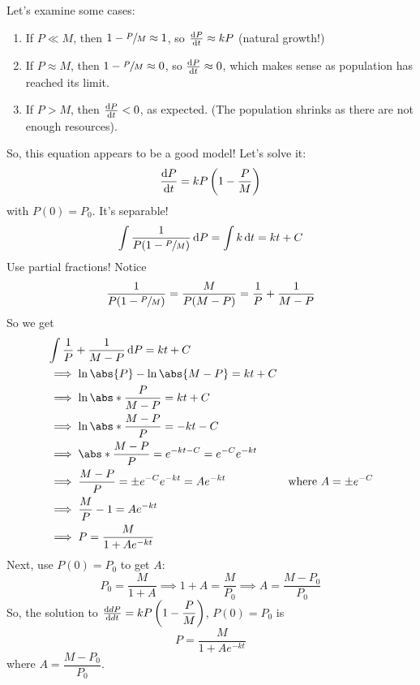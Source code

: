 Let's examine some cases:
\begin{enumerate}[label=(\Roman*)]
    \item If $ P\ll M $, then $ 1-\sfrac{P}{M}\approx 1 $, so $ \odv{P}{t} \approx kP $
          (natural growth!)
    \item If $ P\approx M $, then $ 1-\sfrac{P}{M}\approx 0 $, so $ \odv{P}{t}\approx 0 $,
          which makes sense as population has reached its limit.
    \item If $ P>M $, then $ \odv{P}{t} <0 $, as expected. (The population
          shrinks as there are not enough resources).
\end{enumerate}
So, this equation appears to be a good model! Let's solve it:
\[ \odv{P}{t} =kP\left(1-\frac{P}{M}\right) \]
with $ P(0)=P_0 $. It's separable!
\[ \int \frac{1}{P(1-\sfrac{P}{M})}\odif{P}=\int k\odif{t} =kt+C \]
Use partial fractions! Notice
\[ \frac{1}{P(1-\sfrac{P}{M})}=\frac{M}{P(M-P)} =\frac{1}{P} +\frac{1}{M-P} \]
So we get
\begin{align*}
     & \int \frac{1}{P} +\frac{1}{M-P}\odif{P}  =kt+C                                                   \\
     & \implies  \ln\abs{P}-\ln\abs{M-P}            =kt+C                                               \\
     & \implies  \ln\abs*{\frac{P}{M-P}}        =kt+C                                                   \\
     & \implies \ln\abs*{\frac{M-P}{P}}         =-kt-C                                                  \\
     & \implies  \abs*{\frac{M-P}{P}}           =e^{-kt-C}=e^{-C}e^{-kt}                                \\
     & \implies  \frac{M-P}{P}                  =\pm e^{-C}e^{-kt}=Ae^{-kt} & \text{where }A=\pm e^{-C} \\
     & \implies  \frac{M}{P} -1                 =Ae^{-kt}                                               \\
     & \implies  P                              =\frac{M}{1+Ae^{-kt}}
\end{align*}
Next, use $ P(0)=P_0 $ to get $ A $:
\[ P_0=\frac{M}{1+A}\implies 1+A=\frac{M}{P_0}\implies A=\frac{M-P_0}{P_0}  \]
So, the solution to $ \odv{dP}{dt}=kP\left( 1-\dfrac{P}{M} \right) $, $ P(0)=P_0 $
is
\[ \boxed{P=\frac{M}{1+Ae^{-kt}}}  \]
where $ \boxed{A=\dfrac{M-P_0}{P_0}} $.

